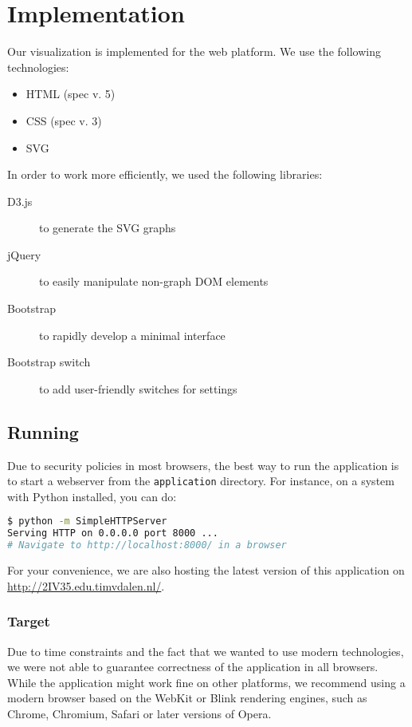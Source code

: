 \section{Implementation}\label{sec:imp}

	Our visualization is implemented for the web platform.
	We use the following technologies:

	\begin{itemize}
		\item HTML (spec v. 5)
		\item CSS (spec v. 3)
		\item SVG
	\end{itemize}

	In order to work more efficiently, we used the following libraries:

	\begin{description}
		\item[D3.js] to generate the SVG graphs
		\item[jQuery] to easily manipulate non-graph DOM elements
		\item[Bootstrap] to rapidly develop a minimal interface
		\item[Bootstrap switch] to add user-friendly switches for settings
	\end{description}

	\subsection{Running}
		Due to security policies in most browsers, the best way to run the application is to start a webserver from the \texttt{application} directory.
		For instance, on a system with Python installed, you can do:

		\begin{lstlisting}[language=bash]
$ python -m SimpleHTTPServer
Serving HTTP on 0.0.0.0 port 8000 ...
# Navigate to http://localhost:8000/ in a browser
		\end{lstlisting}

		For your convenience, we are also hosting the latest version of this application on \url{http://2IV35.edu.timvdalen.nl/}.

		\subsubsection{Target}
			Due to time constraints and the fact that we wanted to use modern technologies, we were not able to guarantee correctness of the application in all browsers.
			While the application might work fine on other platforms, we recommend using a modern browser based on the WebKit or Blink rendering engines, such as Chrome, Chromium, Safari or later versions of Opera.

